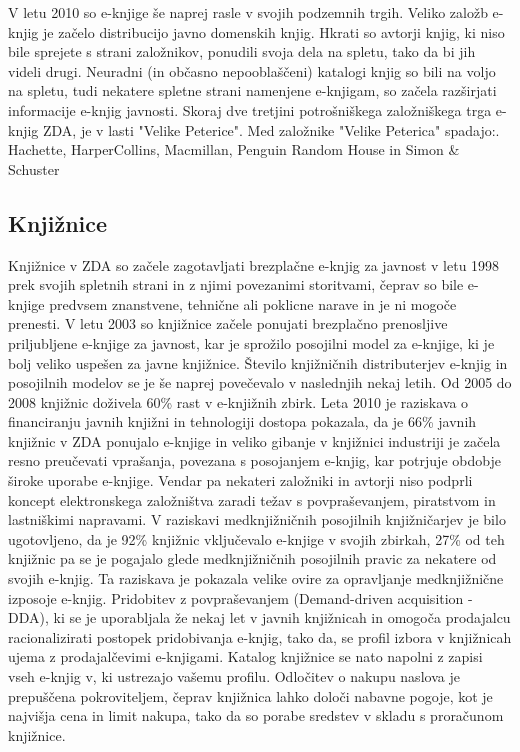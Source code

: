 \documentclass[a4paper, 12pt]{book}
\begin{document}
V letu 2010 so e-knjige še naprej rasle v svojih podzemnih trgih. Veliko založb e-knjig je začelo distribucijo javno domenskih knjig. Hkrati so avtorji knjig, ki niso bile sprejete s strani založnikov,  ponudili svoja dela na spletu, tako da bi jih videli drugi. Neuradni (in občasno nepooblaščeni) katalogi knjig so bili na voljo na spletu, tudi nekatere spletne strani namenjene e-knjigam, so začela razširjati informacije e-knjig javnosti. \cite{11} Skoraj dve tretjini potrošniškega založniškega trga e-knjig ZDA, je v lasti "Velike Peterice". Med založnike "Velike Peterica" spadajo:. Hachette, HarperCollins, Macmillan, Penguin Random House in Simon \& Schuster \cite{12}

\subsection{Knjižnice}
\label{eknjiga_knjiznice}
Knjižnice v ZDA so začele zagotavljati brezplačne e-knjig za javnost v letu 1998 prek svojih spletnih strani in z njimi povezanimi storitvami, \cite{13} čeprav so bile e-knjige predvsem znanstvene, tehnične ali poklicne narave in je ni mogoče prenesti. V letu 2003 so knjižnice začele ponujati brezplačno prenosljive priljubljene e-knjige za javnost, kar je sprožilo posojilni model za e-knjige, ki je bolj veliko uspešen za javne knjižnice. \cite{14} Število knjižničnih distributerjev e-knjig in posojilnih modelov se je še naprej povečevalo v naslednjih nekaj letih. Od 2005 do 2008 knjižnic doživela 60\% rast v e-knjižnih zbirk. \cite{15} Leta 2010 je raziskava o financiranju javnih knjižni in tehnologiji dostopa \cite{16}  pokazala, da je 66\% javnih knjižnic v ZDA ponujalo e-knjige \cite{17} in veliko gibanje v knjižnici industriji je začela resno preučevati vprašanja, povezana s posojanjem e-knjig, kar potrjuje obdobje široke uporabe e-knjige. \cite{18} Vendar pa nekateri založniki in avtorji niso podprli koncept elektronskega založništva zaradi težav s povpraševanjem, piratstvom in lastniškimi napravami. \cite{19} V raziskavi medknjižničnih posojilnih knjižničarjev je bilo ugotovljeno, da je 92\% knjižnic vključevalo e-knjige v svojih zbirkah, 27\% od teh knjižnic pa se je pogajalo glede medknjižničnih posojilnih pravic za nekatere od svojih e-knjig. Ta raziskava je pokazala velike ovire za opravljanje medknjižnične izposoje e-knjig. \cite{20} Pridobitev z povpraševanjem (Demand-driven acquisition - DDA), ki se je uporabljala že nekaj let v javnih knjižnicah in omogoča prodajalcu racionalizirati postopek pridobivanja e-knjig, tako da, se profil izbora v knjižnicah ujema z prodajalčevimi e-knjigami. \cite{21} Katalog knjižnice se nato napolni z zapisi vseh e-knjig v, ki ustrezajo vašemu profilu. \cite{21} Odločitev o nakupu naslova je prepuščena pokroviteljem, čeprav knjižnica lahko določi nabavne pogoje, kot je najvišja cena in limit nakupa, tako da so porabe sredstev v skladu s proračunom knjižnice. \cite{21}
\end{document}
